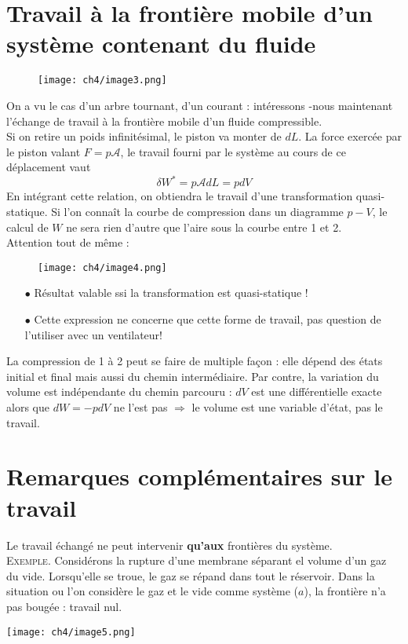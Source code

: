 \section{Travail à la frontière mobile d'un système contenant du 
fluide}
\begin{wrapfigure}[7]{r}{4.7cm}
	\vspace{-7mm}
	\texttt{[image: ch4/image3.png]}
\end{wrapfigure}
On a vu le cas d'un arbre tournant, d'un courant : intéressons 
-nous maintenant l'échange de travail à la frontière mobile d'un 
fluide compressible.\\
Si on retire un poids infinitésimal, le piston va monter de $dL$. 
La force exercée par le piston valant $F = p\mathcal{A}$, le 
travail fourni par le système au cours de ce déplacement vaut
\begin{equation}
	\delta W^* = p\mathcal{A}dL = pdV
\end{equation}
En intégrant cette relation, on obtiendra le travail d'une 
transformation quasi-statique. Si l'on connaît la courbe de 
compression dans un diagramme $p-V$, le calcul de $W$ ne sera 
rien d'autre que l'aire sous la courbe entre 1 et 2.\\

Attention tout de même :\\
\begin{wrapfigure}[10]{l}{4.7cm}
	\vspace{-7mm}
	\texttt{[image: ch4/image4.png]}
\end{wrapfigure}
\vspace{-1cm}
\begin{itemize}
	\item[$\bullet$] Résultat valable ssi la transformation est 
	      quasi-statique !
	\item[$\bullet$] Cette expression ne concerne que cette forme de
	      travail, pas question de l'utiliser avec un ventilateur!
\end{itemize}
La compression de 1 à 2 peut se faire de multiple façon : elle 
dépend des états initial et final mais aussi du chemin 
intermédiaire. Par contre, la variation du volume est indépendante 
du chemin parcouru : $dV$ est une différentielle exacte alors 
que $dW = -pdV$ ne l'est pas $\Longrightarrow$ le volume est 
une variable d'état, pas le travail.


\setcounter{section}{3}
\section{Remarques complémentaires sur le travail}
Le travail échangé ne peut intervenir \textbf{qu'aux} frontières 
du système.\\
\textsc{Exemple.} Considérons la rupture d'une membrane séparant 
el volume d'un gaz du vide. Lorsqu'elle se troue, le gaz se 
répand dans tout le réservoir. Dans la situation ou l'on considère 
le gaz et le vide comme système ($a$), la frontière n'a pas bougée : 
travail nul. 
\begin{center}
	\texttt{[image: ch4/image5.png]}
\end{center}

